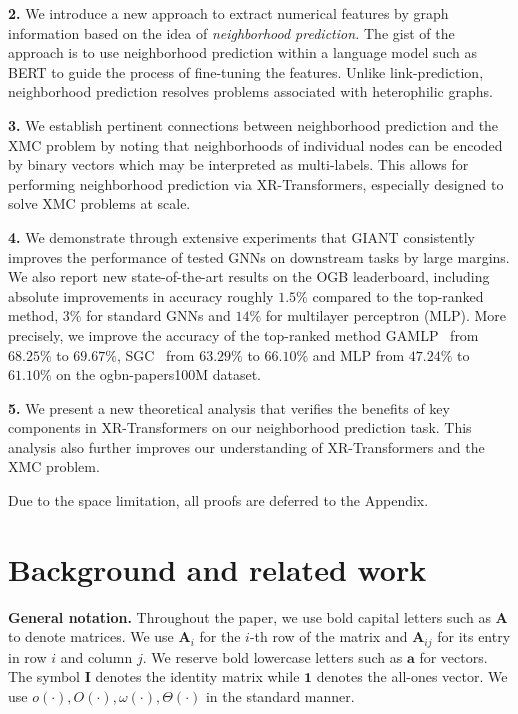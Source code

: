 \documentclass{article} \usepackage{iclr2022_conference,times}
\begin{document}
\textbf{2.} We introduce a new approach to extract numerical features by graph information based on the idea of \emph{neighborhood prediction.} The gist of the approach is to use neighborhood prediction within a language model such as BERT to guide the process of fine-tuning the features. Unlike link-prediction, neighborhood prediction resolves problems associated with heterophilic graphs.

\textbf{3.} We establish pertinent connections between neighborhood prediction and the XMC problem by noting that neighborhoods of individual nodes can be encoded by binary vectors which may be interpreted as multi-labels. This allows for performing neighborhood prediction via XR-Transformers, especially designed to solve XMC problems at scale.

\textbf{4.} We demonstrate through extensive experiments that GIANT consistently improves the performance of tested GNNs on downstream tasks by large margins. We also report new state-of-the-art results on the OGB leaderboard, including absolute improvements in accuracy roughly $1.5\%$ compared to the top-ranked method, $3\%$ for standard GNNs and $14\%$ for multilayer perceptron (MLP). More precisely, we improve the accuracy of the top-ranked method GAMLP~\citep{zhang2021graph} from $68.25\%$ to $69.67\%$, SGC~\citep{wu2019simplifying} from $63.29\%$ to $66.10\%$ and MLP from $47.24\%$ to $61.10\%$ on the ogbn-papers100M dataset. 

\textbf{5.} We present a new theoretical analysis that verifies the benefits of key components in XR-Transformers on our neighborhood prediction task. This analysis also further improves our understanding of XR-Transformers and the XMC problem.

Due to the space limitation, all proofs are deferred to the Appendix.

\vspace{-0.3cm}
\section{Background and related work}
\textbf{General notation. }Throughout the paper, we use bold capital letters such as $\mathbf{A}$ to denote matrices. We use $\mathbf{A}_i$ for the $i$-th row of the matrix and $\mathbf{A}_{ij}$ for its entry in row $i$ and column $j$. We reserve bold lowercase letters such as $\mathbf{a}$ for vectors. The symbol $\mathbf{I}$ denotes the identity matrix while $\mathbf{1}$ denotes the all-ones vector. We use $o(\cdot), O(\cdot), \omega(\cdot), \Theta(\cdot)$ in the standard manner.
\end{document}
